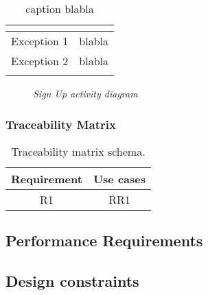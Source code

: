 \begin{longtable}{ | c | p{10cm} | }
\begin{itemize}
    \end{itemize}                                                                                                                                                                                                                                             \\
    \hline
    \hline
    Exception 1      & blabla \\
    \hline
    Exception 2      & blabla                                                         \\
    \hline
    \caption{caption blabla}                                                                                                                                                                                                                                                                    \\
\end{longtable}


\begin{figure}[!h]
    \centering
    \caption{\textit{Sign Up activity diagram}}
\end{figure}
\newpage





\subsubsection{Traceability Matrix}
\begin{table}[H]
    \begin{center}
        \begin{tabular}{|c| c|}
            \hline
            \textbf{Requirement} & \textbf{Use cases}   \\
            \hline
            R1                   & RR1      \\
            \hline
        \end{tabular}
        \caption{Traceability matrix schema.}
    \end{center}
\end{table}


\subsection{Performance Requirements}

\subsection{Design constraints}
